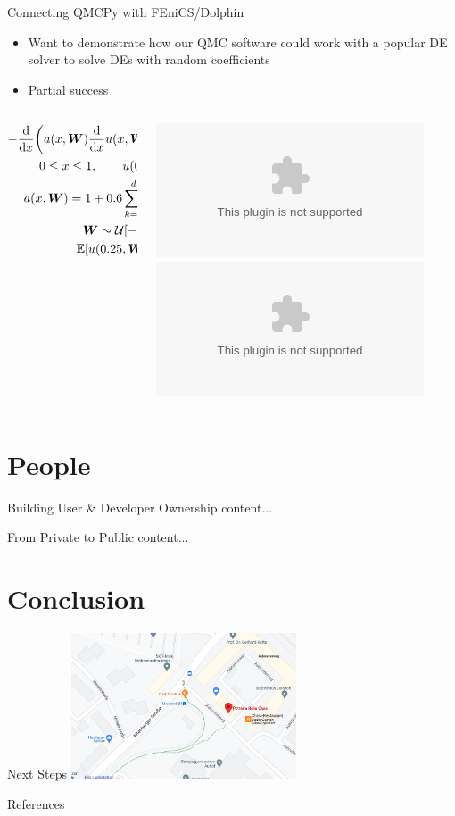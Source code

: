 \documentclass[11pt,compress,xcolor={usenames,dvipsnames},aspectratio=169]{beamer}
\begin{document}
\begin{frame}{Connecting QMCPy with FEniCS/Dolphin}
	\begin{itemize}
		\item Want to demonstrate how our QMC software could work with a popular DE solver to solve DEs with random coefficients
		\item Partial success
	\end{itemize}
	\begin{columns}
		\begin{column}{0.5\textwidth}
			\begin{gather*}
				-\frac{{\rm d} }{{\rm d} x}\biggl(a(x,\boldsymbol{W}) \frac{{\rm d}}{{\rm d} x} u(x,\boldsymbol{W}) \biggr) = 100( 2x - 1)\\
				0 \leq x \leq 1, \qquad
				u(0) = u(1) = 0 \\
				a(x,\boldsymbol{W}) = 1 + 0.6 \sum_{k=1}^d \frac{W_k T_{k}(2x-1)}{k^2} \\
				\boldsymbol{W} \sim \mathcal{U}[-1,1]^d \\
				\operatorname{\mathbb{E}}[u(0.25,\boldsymbol{W}) = ?]
			\end{gather*}
		\end{column}
		\begin{column}{0.5\textwidth}
			\centering
			\includegraphics<1>[width=\textwidth]{ProgramsImages/axwtrue0.6.eps}
			\includegraphics<2->[width=\textwidth]{ProgramsImages/timing-2.eps}
		\end{column}
	\end{columns}
\end{frame}


\section{People}
\begin{frame}{Building User \& Developer Ownership}
	content...
\end{frame}

\begin{frame}{From Private to Public}
	content...
\end{frame}

\section{Conclusion}

\begin{frame}{Next Steps}
	\includegraphics[width=0.5\textwidth]{ProgramsImages/PizeriaBellaCasa.png}
\end{frame}

\begin{frame}[allowframebreaks]{References}
	\printbibliography
\end{frame}
\end{document}
